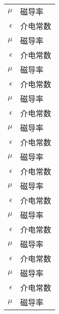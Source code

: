 \begin{nomenclature*}
\begin{longtable}{rl}
  $\mu$       & 磁导率    \\
  $\epsilon$  & 介电常数  \\
  $\mu$       & 磁导率    \\
  $\epsilon$  & 介电常数  \\
  $\mu$       & 磁导率    \\
  $\epsilon$  & 介电常数  \\
  $\mu$       & 磁导率    \\
  $\epsilon$  & 介电常数  \\
  $\mu$       & 磁导率    \\
  $\epsilon$  & 介电常数  \\
  $\mu$       & 磁导率    \\
  $\epsilon$  & 介电常数  \\
  $\mu$       & 磁导率    \\
  $\epsilon$  & 介电常数  \\
  $\mu$       & 磁导率    \\
  $\epsilon$  & 介电常数  \\
  $\mu$       & 磁导率    \\
  $\epsilon$  & 介电常数  \\
  $\mu$       & 磁导率    \\
  $\epsilon$  & 介电常数  \\
  $\mu$       & 磁导率    \\
\end{longtable}

\end{nomenclature*}
